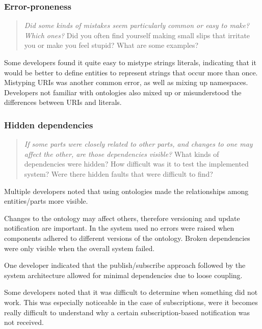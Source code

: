 \subsubsection{Error-proneness}

\begin{quote}
	\emph{Did some kinds of mistakes seem particularly common or easy to make? Which ones?}
	Did you often find yourself making small slips that irritate you or make you feel stupid? What are some examples?
\end{quote}

Some developers found it quite easy to mistype strings literals, indicating that it would be better to define entities to represent strings that occur more than once. Mistyping URIs was another common error, as well as mixing up namespaces. Developers not familiar with ontologies also mixed up or misunderstood the differences between URIs and literals.

\subsubsection{Hidden dependencies}

\begin{quote}
	\emph{If some parts were closely related to other parts, and changes to one may affect the other, are those dependencies visible?}
	What kinds of dependencies were hidden? How difficult was it to test the implemented system? Were there hidden faults that were difficult to find?
\end{quote}

Multiple developers noted that using ontologies made the relationships among entities/parts more visible. 

Changes to the ontology may affect others, therefore versioning and update notification are important. In the system used no errors were raised when components adhered to different versions of the ontology. Broken dependencies were only visible when the overall system failed.

One developer indicated that the publish/subscribe approach followed by the system architecture allowed for minimal dependencies due to loose coupling.

Some developers noted that it was difficult to determine when something did not work. This was especially noticeable in the case of subscriptions, were it becomes really difficult to understand why a certain subscription-based notification was not received.

